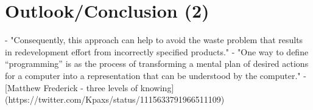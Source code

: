 \chapter{Outlook/Conclusion (2)}
- "Consequently, this approach can help to avoid the waste problem that results in redevelopment effort from incorrectly specified products." \autocite[10]{sheldon_software_2000}
- "One way to define “programming” is as the process of transforming a mental plan of desired actions for a computer into a representation that can be understood by the computer." \autocite{myers_past_2009}
- [Matthew Frederick - three levels of knowing](https://twitter.com/Kpaxs/status/1115633791966511109)